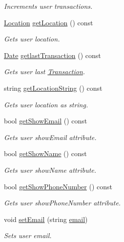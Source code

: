 \begin{DoxyCompactItemize}
\begin{DoxyCompactList}\small\item\em Increments user transactions. \end{DoxyCompactList}\item 
\hyperlink{class_location}{Location} \hyperlink{class_user_a7c2072cbf540ae1bd47992b40783843c}{get\+Location} () const 
\begin{DoxyCompactList}\small\item\em Gets user location. \end{DoxyCompactList}\item 
\hyperlink{class_date}{Date} \hyperlink{class_user_a45578b6f400e3f8ef55d6c44651e1c9a}{getlast\+Transaction} () const 
\begin{DoxyCompactList}\small\item\em Gets user last \hyperlink{class_transaction}{Transaction}. \end{DoxyCompactList}\item 
string \hyperlink{class_user_a7185d303044e8dbb683b717228e2560d}{get\+Location\+String} () const 
\begin{DoxyCompactList}\small\item\em Gets user location as string. \end{DoxyCompactList}\item 
bool \hyperlink{class_user_a6d936807efcd03cf1763742668ff8b7a}{get\+Show\+Email} () const 
\begin{DoxyCompactList}\small\item\em Gets user show\+Email attribute. \end{DoxyCompactList}\item 
bool \hyperlink{class_user_a232cf36107c8b0f7ff9440fc97cb402f}{get\+Show\+Name} () const 
\begin{DoxyCompactList}\small\item\em Gets user show\+Name attribute. \end{DoxyCompactList}\item 
bool \hyperlink{class_user_a55730e5ee153d90c64b1871d06055c26}{get\+Show\+Phone\+Number} () const 
\begin{DoxyCompactList}\small\item\em Gets user show\+Phone\+Number attribute. \end{DoxyCompactList}\item 
void \hyperlink{class_user_a9d38dd7a9f5ca79cf17ecf572d42c647}{set\+Email} (string \hyperlink{class_user_a2d678acd22b533660b4b7d8404961f14}{email})
\begin{DoxyCompactList}\small\item\em Sets user email. \end{DoxyCompactList}\item 

\end{DoxyCompactItemize}
